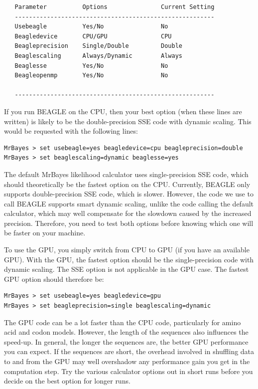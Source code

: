 \documentclass[12pt]{book}
\begin{document}
\footnotesize
\begin{singlespacing}
\begin{verbatim}
   Parameter          Options               Current Setting
   --------------------------------------------------------
   Usebeagle          Yes/No                No             
   Beagledevice       CPU/GPU               CPU            
   Beagleprecision    Single/Double         Double         
   Beaglescaling      Always/Dynamic        Always         
   Beaglesse          Yes/No                No             
   Beagleopenmp       Yes/No                No             
                                                           
   --------------------------------------------------------
\end{verbatim}
\end{singlespacing}
\normalsize

If you run BEAGLE on the CPU, then your best option (when these lines are written) is likely to be
the double-precision SSE code with dynamic scaling. This would be requested with the following
lines:

\begin{verbatim}
MrBayes > set usebeagle=yes beagledevice=cpu beagleprecision=double
MrBayes > set beaglescaling=dynamic beaglesse=yes
\end{verbatim}

The default MrBayes likelihood calculator uses single-precision SSE code, which should
theoretically be the fastest option on the CPU. Currently, BEAGLE only supports double-precision
SSE code, which is slower. However, the code we use to call BEAGLE supports smart dynamic scaling,
unlike the code calling the default calculator, which may well compensate for the slowdown caused
by the increased precision. Therefore, you need to test both options before knowing which one will
be faster on your machine.

To use the GPU, you simply switch from CPU to GPU (if you have an available GPU). With the GPU, the
fastest option should be the single-precision code with dynamic scaling. The SSE option is not
applicable in the GPU case. The fastest GPU option should therefore be:

\begin{verbatim}
MrBayes > set usebeagle=yes beagledevice=gpu
MrBayes > set beagleprecision=single beaglescaling=dynamic
\end{verbatim}

The GPU code can be a lot faster than the CPU code, particularly for amino acid and codon models.
However, the length of the sequences also influences the speed-up. In general, the longer the
sequences are, the better GPU performance you can expect. If the sequences are short, the overhead
involved in shuffling data to and from the GPU may well overshadow any performance gain you get in
the computation step. Try the various calculator options out in short runs before you decide on the
best option for longer runs.
\end{document}
